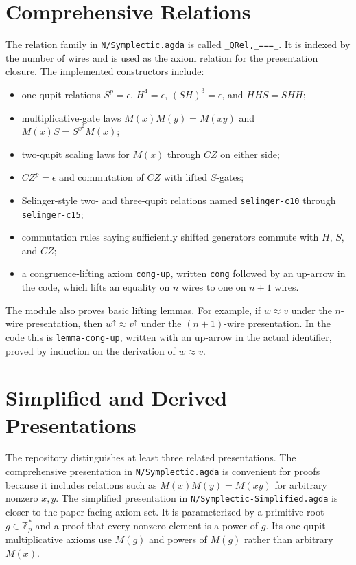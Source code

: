 \documentclass[sigplan,screen,review,anonymous]{acmart}
\newcommand{\Zp}{\mathbb{Z}_p}
\newcommand{\file}[1]{\texttt{#1}}
\begin{document}
\section{Comprehensive Relations}

The relation family in \file{N/Symplectic.agda} is called
\texttt{\_QRel,\_===\_}.  It is indexed by the number of wires and is
used as the axiom relation for the presentation closure.  The
implemented constructors include:

\begin{itemize}
\item one-qupit relations \(S^p = \epsilon\), \(H^4 = \epsilon\),
  \((S H)^3 = \epsilon\), and \(H H S = S H H\);
\item multiplicative-gate laws \(M(x)M(y)=M(xy)\) and
  \(M(x)S = S^{x^2}M(x)\);
\item two-qupit scaling laws for \(M(x)\) through \(CZ\) on either
  side;
\item \(CZ^p=\epsilon\) and commutation of \(CZ\) with lifted
  \(S\)-gates;
\item Selinger-style two- and three-qupit relations named
  \texttt{selinger-c10} through \texttt{selinger-c15};
\item commutation rules saying sufficiently shifted generators commute
  with \(H\), \(S\), and \(CZ\);
\item a congruence-lifting axiom \texttt{cong-up}, written
  \texttt{cong} followed by an up-arrow in the code, which lifts an
  equality on \(n\) wires to one on \(n+1\) wires.
\end{itemize}

The module also proves basic lifting lemmas.  For example, if
\(w \approx v\) under the \(n\)-wire presentation, then
\(w^\uparrow \approx v^\uparrow\) under the \((n+1)\)-wire
presentation.  In the code this is \texttt{lemma-cong-up}, written
with an up-arrow in the actual identifier, proved by induction on the
derivation of \(w \approx v\).

\section{Simplified and Derived Presentations}

The repository distinguishes at least three related presentations.
The comprehensive presentation in \file{N/Symplectic.agda} is
convenient for proofs because it includes relations such as
\(M(x)M(y)=M(xy)\) for arbitrary nonzero \(x,y\).  The simplified
presentation in \file{N/Symplectic-Simplified.agda} is closer to the
paper-facing axiom set.  It is parameterized by a primitive root
\(g \in \Zp^\ast\) and a proof that every nonzero element is a power
of \(g\).  Its one-qupit multiplicative axioms use \(M(g)\) and
powers of \(M(g)\) rather than arbitrary \(M(x)\).
\end{document}
